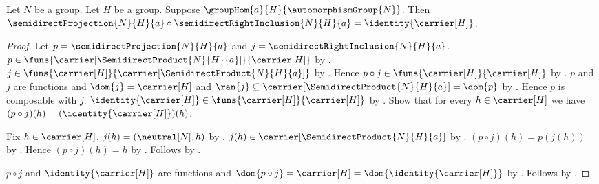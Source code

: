 \begin{theorem}\label{semidirect_right_inclusion_section}
    Let $N$ be a group.
    Let $H$ be a group.
    Suppose $\groupHom{a}{H}{\automorphismGroup{N}}$.
    Then
        $\semidirectProjection{N}{H}{a}\circ
            \semidirectRightInclusion{N}{H}{a}
        =\identity{\carrier[H]}$.
\end{theorem}
\begin{proof}
    Let $p=\semidirectProjection{N}{H}{a}$ and
        $j=\semidirectRightInclusion{N}{H}{a}$.
    $p\in\funs{\carrier[\SemidirectProduct{N}{H}{a}]}{\carrier[H]}$ by
        .
    $j\in\funs{\carrier[H]}{\carrier[\SemidirectProduct{N}{H}{a}]}$ by
        .
    Hence $p\circ j\in\funs{\carrier[H]}{\carrier[H]}$ by
        .
    $p$ and $j$ are functions and $\dom{j}=\carrier[H]$ and
        $\ran{j}\subseteq\carrier[\SemidirectProduct{N}{H}{a}]
            =\dom{p}$ by .
    Hence $p$ is composable with $j$.
    $\identity{\carrier[H]}\in\funs{\carrier[H]}{\carrier[H]}$ by
        .
    Show that for every $h\in\carrier[H]$ we have
        $(p\circ j)(h)=(\identity{\carrier[H]})(h)$.
    \begin{subproof}
        Fix $h\in\carrier[H]$.
        $j(h)=(\neutral[N],h)$ by
            .
        $j(h)\in\carrier[\SemidirectProduct{N}{H}{a}]$ by
            .
        $(p\circ j)(h)=p(j(h))$ by .
        Hence $(p\circ j)(h)=h$ by
            .
        Follows by .
    \end{subproof}
    $p\circ j$ and $\identity{\carrier[H]}$ are functions and
        $\dom{p\circ j}=\carrier[H]
            =\dom{\identity{\carrier[H]}}$ by .
    Follows by .
\end{proof}

